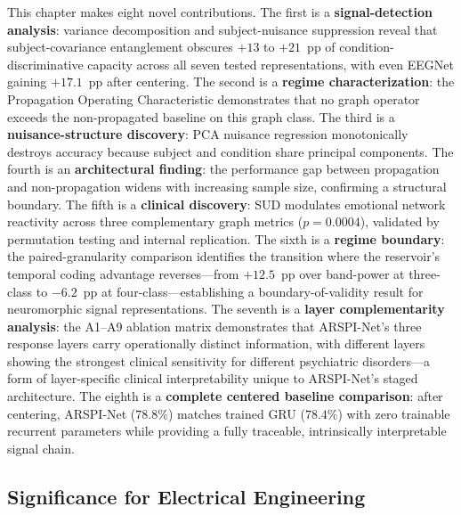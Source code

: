 This chapter makes eight novel contributions. The first is a \textbf{signal-detection analysis}: variance decomposition and subject-nuisance suppression reveal that subject-covariance entanglement obscures $+13$ to $+21$~pp of condition-discriminative capacity across all seven tested representations, with even EEGNet gaining $+17.1$~pp after centering. The second is a \textbf{regime characterization}: the Propagation Operating Characteristic demonstrates that no graph operator exceeds the non-propagated baseline on this graph class. The third is a \textbf{nuisance-structure discovery}: PCA nuisance regression monotonically destroys accuracy because subject and condition share principal components. The fourth is an \textbf{architectural finding}: the performance gap between propagation and non-propagation widens with increasing sample size, confirming a structural boundary. The fifth is a \textbf{clinical discovery}: SUD modulates emotional network reactivity across three complementary graph metrics ($p = 0.0004$), validated by permutation testing and internal replication. The sixth is a \textbf{regime boundary}: the paired-granularity comparison identifies the transition where the reservoir's temporal coding advantage reverses---from $+12.5$~pp over band-power at three-class to $-6.2$~pp at four-class---establishing a boundary-of-validity result for neuromorphic signal representations. The seventh is a \textbf{layer complementarity analysis}: the A1--A9 ablation matrix demonstrates that ARSPI-Net's three response layers carry operationally distinct information, with different layers showing the strongest clinical sensitivity for different psychiatric disorders---a form of layer-specific clinical interpretability unique to ARSPI-Net's staged architecture. The eighth is a \textbf{complete centered baseline comparison}: after centering, ARSPI-Net ($78.8\%$) matches trained GRU ($78.4\%$) with zero trainable recurrent parameters while providing a fully traceable, intrinsically interpretable signal chain.

\subsection{Significance for Electrical Engineering}

